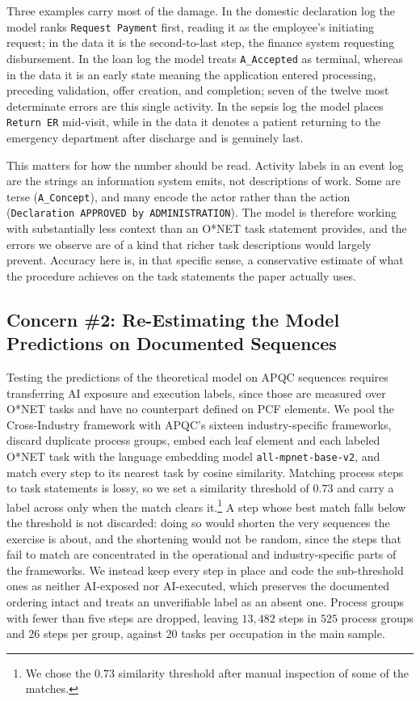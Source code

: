 Three examples carry most of the damage.
In the domestic declaration log the model ranks \texttt{Request Payment} first, reading it as the employee's initiating request; in the data it is the second-to-last step, the finance system requesting disbursement.
In the loan log the model treats \texttt{A\_Accepted} as terminal, whereas in the data it is an early state meaning the application entered processing, preceding validation, offer creation, and completion; seven of the twelve most determinate errors are this single activity.
In the sepsis log the model places \texttt{Return ER} mid-visit, while in the data it denotes a patient returning to the emergency department after discharge and is genuinely last.

This matters for how the number should be read.
Activity labels in an event log are the strings an information system emits, not descriptions of work.
Some are terse (\texttt{A\_Concept}), and many encode the actor rather than the action (\texttt{Declaration APPROVED by ADMINISTRATION}).
The model is therefore working with substantially less context than an O*NET task statement provides, and the errors we observe are of a kind that richer task descriptions would largely prevent.
Accuracy here is, in that specific sense, a conservative estimate of what the procedure achieves on the task statements the paper actually uses.


\subsection{Concern \#2: Re-Estimating the Model Predictions on Documented Sequences}
\label{app:apqc_fragmentation_top}

Testing the predictions of the theoretical model on APQC sequences requires transferring AI exposure and execution labels, since those are measured over O*NET tasks and have no counterpart defined on PCF elements.
We pool the Cross-Industry framework with APQC's sixteen industry-specific frameworks, discard duplicate
process groups, embed each leaf element and each labeled O*NET task with the language embedding model \texttt{all-mpnet-base-v2}, and match every step to its nearest task by cosine similarity.
Matching process steps to task statements is lossy, so we set a similarity threshold of $0.73$ and carry a
label across only when the match clears it.\footnote{We chose the $0.73$ similarity threshold after manual inspection of some of the matches.}
A step whose best match falls below the threshold is not discarded: doing so would shorten the very sequences
the exercise is about, and the shortening would not be random, since the steps that fail to match are
concentrated in the operational and industry-specific parts of the frameworks.
We instead keep every step in place and code the sub-threshold ones as neither AI-exposed nor AI-executed,
which preserves the documented ordering intact and treats an unverifiable label as an absent one.
Process groups with fewer than five steps are dropped, leaving $13{,}482$ steps in $525$ process groups and
$26$ steps per group, against $20$ tasks per occupation in the main sample.

